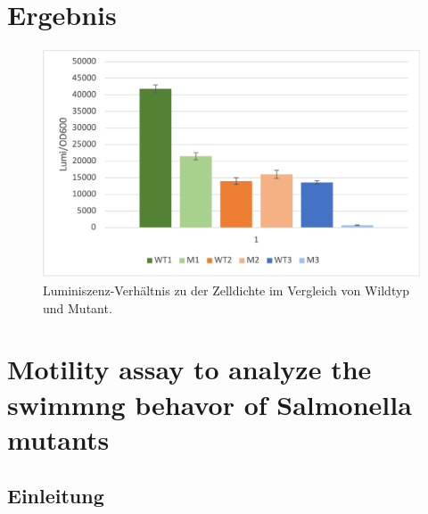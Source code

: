 \documentclass[oneside,10pt,a4paper]{report}
\begin{document}
			\section{Ergebnis}
			
				\begin{figure}[H]
				\centering
				\includegraphics[scale=0.7]{Exp6Lumi.png}
				\caption{Luminiszenz-Verhältnis zu der Zelldichte im Vergleich von Wildtyp und Mutant.}
				\label{fig: Lumi}
			\end{figure}
			
		\section{Motility assay to analyze the swimmng behavor of Salmonella mutants}
		
			\subsection{Einleitung}
			
\end{document}
